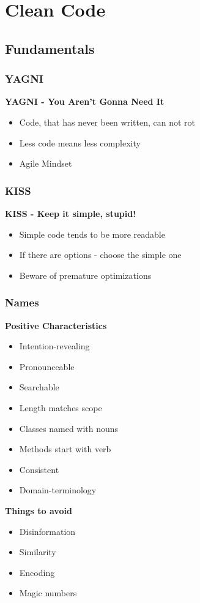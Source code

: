 
\section{Clean Code}
\subsection{Fundamentals}
\subsubsection{YAGNI}
\textbf{YAGNI - You Aren't Gonna Need It}
\begin{itemize}
    \item Code, that has never been written, can not rot
    \item Less code means less complexity
    \item Agile Mindset
\end{itemize}

\subsubsection{KISS}
\textbf{KISS - Keep it simple, stupid!}
\begin{itemize}
    \item Simple code tends to be more readable
    \item If there are options - choose the simple one
    \item Beware of premature optimizations
\end{itemize}

\subsubsection{Names}
\textbf{Positive Characteristics}
\begin{itemize}
    \item Intention-revealing
    \item Pronounceable
    \item Searchable
    \item Length matches scope
    \item Classes named with nouns
    \item Methods start with verb
    \item Consistent
    \item Domain-terminology
\end{itemize}
\textbf{Things to avoid}
\begin{itemize}
    \item Disinformation
    \item Similarity
    \item Encoding
    \item Magic numbers
\end{itemize}

